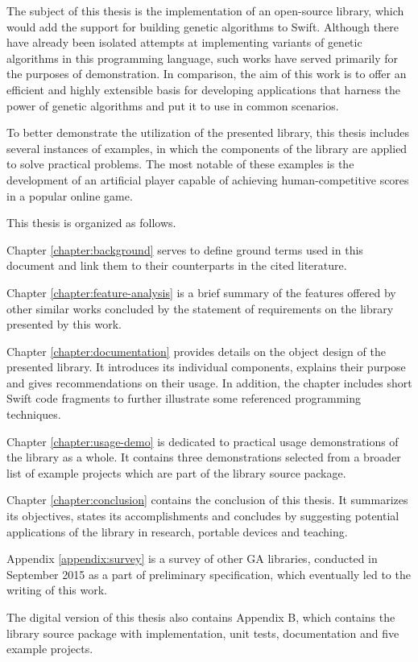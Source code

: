 The subject of this thesis is the implementation of an open-source library, which would add the support for building genetic algorithms to Swift. Although there have already been isolated attempts at implementing variants of genetic algorithms in this programming language, such works have served primarily for the purposes of demonstration. In comparison, the aim of this work is to offer an efficient and highly extensible basis for developing applications that harness the power of genetic algorithms and put it to use in common scenarios.

To better demonstrate the utilization of the presented library, this thesis includes several instances of examples, in which the components of the library are applied to solve practical problems. The most notable of these examples is the development of an artificial player capable of achieving human-competitive scores in a popular online game.

This thesis is organized as follows.

Chapter \ref{chapter:background} serves to define ground terms used in this document and link them to their counterparts in the cited literature.

Chapter \ref{chapter:feature-analysis} is a brief summary of the features offered by other similar works concluded by the statement of requirements on the library presented by this work.

Chapter \ref{chapter:documentation} provides details on the object design of the presented library. It introduces its individual components, explains their purpose and gives recommendations on their usage. In addition, the chapter includes short Swift code fragments to further illustrate some referenced programming techniques. 

Chapter \ref{chapter:usage-demo} is dedicated to practical usage demonstrations of the library as a whole. It contains three demonstrations selected from a broader list of example projects which are part of the library source package. 

Chapter \ref{chapter:conclusion} contains the conclusion of this thesis. It summarizes its objectives, states its accomplishments and concludes by suggesting potential applications of the library in research, portable devices and teaching.

Appendix \ref{appendix:survey} is a survey of other GA libraries, conducted in September 2015 as a part of preliminary specification, which eventually led to the writing of this work.

The digital version of this thesis also contains Appendix B, which contains the library source package with implementation, unit tests, documentation and five example projects.
